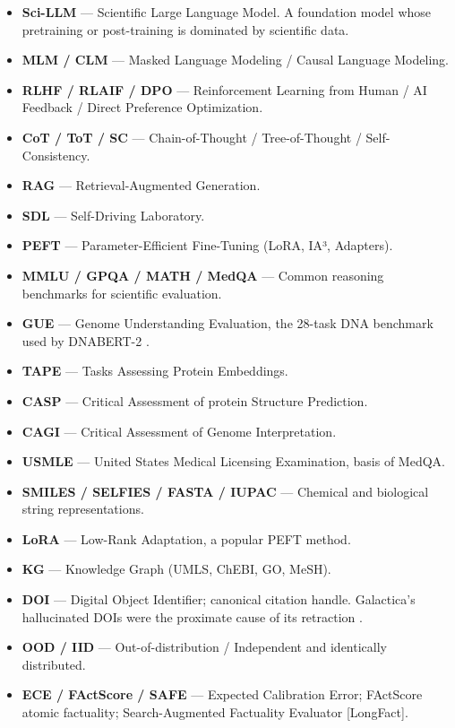 \documentclass{article}
\begin{document}
\begin{itemize}

\item
  \textbf{Sci-LLM} --- Scientific Large Language Model. A foundation model whose pretraining or post-training is dominated by scientific data.
\item
  \textbf{MLM / CLM} --- Masked Language Modeling / Causal Language Modeling.
\item
  \textbf{RLHF / RLAIF / DPO} --- Reinforcement Learning from Human / AI Feedback / Direct Preference Optimization.
\item
  \textbf{CoT / ToT / SC} --- Chain-of-Thought / Tree-of-Thought / Self-Consistency.
\item
  \textbf{RAG} --- Retrieval-Augmented Generation.
\item
  \textbf{SDL} --- Self-Driving Laboratory.
\item
  \textbf{PEFT} --- Parameter-Efficient Fine-Tuning (LoRA, IA³, Adapters).
\item
  \textbf{MMLU / GPQA / MATH / MedQA} --- Common reasoning benchmarks for scientific evaluation.
\item
  \textbf{GUE} --- Genome Understanding Evaluation, the 28-task DNA benchmark used by DNABERT-2 \cite{zhou2023arxiv2306150062023}.
\item
  \textbf{TAPE} --- Tasks Assessing Protein Embeddings.
\item
  \textbf{CASP} --- Critical Assessment of protein Structure Prediction.
\item
  \textbf{CAGI} --- Critical Assessment of Genome Interpretation.
\item
  \textbf{USMLE} --- United States Medical Licensing Examination, basis of MedQA.
\item
  \textbf{SMILES / SELFIES / FASTA / IUPAC} --- Chemical and biological string representations.
\item
  \textbf{LoRA} --- Low-Rank Adaptation, a popular PEFT method.
\item
  \textbf{KG} --- Knowledge Graph (UMLS, ChEBI, GO, MeSH).
\item
  \textbf{DOI} --- Digital Object Identifier; canonical citation handle. Galactica's hallucinated DOIs were the proximate cause of its retraction \cite{taylor2022arxiv2211090852022}.
\item
  \textbf{OOD / IID} --- Out-of-distribution / Independent and identically distributed.
\item
  \textbf{ECE / FActScore / SAFE} --- Expected Calibration Error; FActScore atomic factuality; Search-Augmented Factuality Evaluator {[}LongFact{]}.
\end{itemize}
\end{document}
